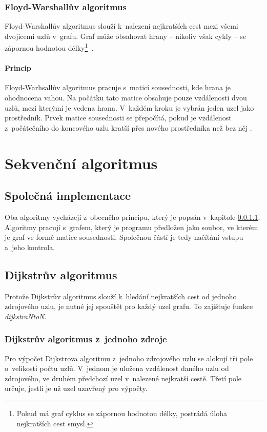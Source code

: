 \subsubsection{Floyd-Warshallův algoritmus}
Floyd-Warshallův algoritmus slouží k~nalezení nejkratších cest mezi všemi dvojicemi uzlů v~grafu. Graf může obsahovat hrany -- nikoliv však cykly -- se zápornou hodnotou délky\footnote{Pokud má graf cyklus se zápornou hodnotou délky, postrádá úloha nejkratších cest smysl.}~\cite{w:fw:def}.

\paragraph{Princip} \label{l:fw:princip}
Floyd-Warhsallův algoritmus pracuje s~maticí sousednosti, kde hrana je ohodnocena vahou. Na počátku tato matice obsahuje pouze vzdálenosti dvou uzlů, mezi kterými je vedena hrana. V~každém kroku je vybrán jeden uzel jako prostředník. Prvek matice sousednosti se přepočítá, pokud je vzdálenost z~počátečního do koncového uzlu kratší přes nového prostředníka než bez něj \cite{w:fw:def}.


\section{Sekvenční algoritmus}
\subsection{Společná implementace}
Oba algoritmy vycházejí z~obecněho principu, který je popsán v~kapitole \ref{l:fw:princip}. Algoritmy pracují s~grafem, který je programu předložen jako soubor, ve kterém je graf ve formě matice sousednosti. Společnou částí je tedy načítání vstupu a~jeho kontrola.

\subsection{Dijkstrův algoritmus}
Protože Dijkstrův algoritmus slouží k~hledání nejkratších cest od jednoho zdrojového uzlu, je nutné jej spouštět pro každý uzel grafu. To zajišťuje funkce \textit{dijkstraNtoN}.

\subsubsection{Dijkstrův algoritmus z~jednoho zdroje}
Pro výpočet Dijkstrova algoritmu z~jednoho zdrojového uzlu se alokují tři pole o~velikosti počtu uzlů. V~jednom je uložena vzdálenost daného uzlu od zdrojového, ve druhém předchozí uzel v~nalezené nejkratší cestě. Třetí pole určuje, jestli je už uzel uzavřený pro výpočty.

